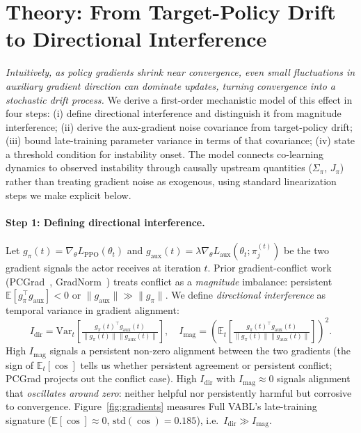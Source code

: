 \documentclass{article}
\theoremstyle{plain}
\theoremstyle{definition}
\theoremstyle{remark}
\begin{document}
\section{Theory: From Target-Policy Drift to Directional Interference}
\label{sec:theory}

\emph{Intuitively, as policy gradients shrink near convergence, even
small fluctuations in auxiliary gradient direction can dominate
updates, turning convergence into a stochastic drift process.} We
derive a first-order mechanistic model of this effect in four steps:
(i) define directional interference and distinguish it from magnitude
interference; (ii) derive the aux-gradient noise covariance from
target-policy drift; (iii) bound late-training parameter variance
in terms of that covariance; (iv) state a threshold condition for
instability onset. The model connects co-learning dynamics to
observed instability through causally upstream quantities ($\Sigma_\pi$,
$J_\pi$) rather than treating gradient noise as exogenous, using
standard linearization steps we make explicit below.

\paragraph{Step 1: Defining directional interference.} Let
$g_\pi(t) = \nabla_\theta L_{\mathrm{PPO}}(\theta_t)$ and
$g_{\mathrm{aux}}(t) = \lambda \nabla_\theta L_{\mathrm{aux}}(\theta_t;
\pi_j^{(t)})$ be the two gradient signals the actor receives at
iteration $t$. Prior gradient-conflict work
(PCGrad~\cite{yu2020gradient}, GradNorm~\cite{chen2018gradnorm})
treats conflict as a \emph{magnitude} imbalance: persistent
$\mathbb{E}[g_\pi^\top g_{\mathrm{aux}}] < 0$ or
$\|g_{\mathrm{aux}}\| \gg \|g_\pi\|$. We define \emph{directional
interference} as temporal variance in gradient alignment:
\begin{equation}
    I_{\mathrm{dir}}
    = \mathrm{Var}_t\!\left[\tfrac{g_\pi(t)^\top g_{\mathrm{aux}}(t)}{\|g_\pi(t)\|\|g_{\mathrm{aux}}(t)\|}\right],
    \quad
    I_{\mathrm{mag}}
    = \left(\mathbb{E}_t\!\left[\tfrac{g_\pi(t)^\top g_{\mathrm{aux}}(t)}{\|g_\pi(t)\|\|g_{\mathrm{aux}}(t)\|}\right]\right)^2 .
    \label{eq:idir}
\end{equation}
High $I_{\mathrm{mag}}$ signals a persistent non-zero alignment
between the two gradients (the sign of $\mathbb{E}_t[\cos]$ tells
us whether persistent agreement or persistent conflict; PCGrad
projects out the conflict case). High $I_{\mathrm{dir}}$ with
$I_{\mathrm{mag}} \approx 0$ signals alignment that
\emph{oscillates around zero}: neither helpful nor persistently
harmful but corrosive to convergence.
Figure~\ref{fig:gradients} measures Full VABL's late-training signature
($\mathbb{E}[\cos] \approx 0$, $\mathrm{std}(\cos) = 0.185$), i.e.\
$I_{\mathrm{dir}} \gg I_{\mathrm{mag}}$.
\end{document}
